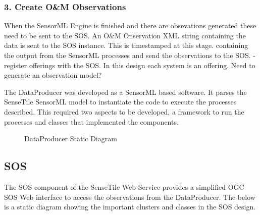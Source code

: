 \documentclass[]{final_report}
\begin{document}
\subsubsection {3. Create O\&M Observations}

When the SensorML Engine is finished
and there are obsevations generated these
need to be sent to the SOS. An O\&M Onservation
XML string containing the data is sent to
the SOS instance. This is timestamped at
this stage.
 containing the output from
the SensorML processes and send the observations
to the SOS.
-register offerings with the SOS. In this design
each system is an offering.
Need to generate an observation model?


The DataProducer was developed as a SensorML based software. It parses the SenseTile SensorML model to instantiate the code to execute the processes described. This required two aspects to be developed, a framework to run the processes and classes that implemented the components.

\begin{figure}[h]
\centering
{}
\caption{DataProducer Static Diagram}\label{fig:bon_static_diagam_producer.png}
\end{figure}


\newpage
\subsection {SOS}

The SOS component of the SenseTile Web Service provides a simplified OGC SOS Web interface to access the observations from the DataProducer. The below is a static diagram showing the important clusters and classes in the SOS design.
\end{document}

